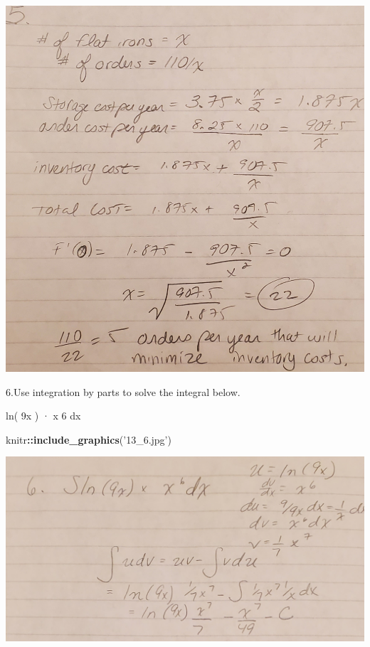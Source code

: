 \documentclass[
]{article}
\newenvironment{Shaded}{\begin{snugshade}}{\end{snugshade}}
\newcommand{\KeywordTok}[1]{\textcolor[rgb]{0.13,0.29,0.53}{\textbf{#1}}}
\newcommand{\NormalTok}[1]{#1}
\newcommand{\OperatorTok}[1]{\textcolor[rgb]{0.81,0.36,0.00}{\textbf{#1}}}
\newcommand{\StringTok}[1]{\textcolor[rgb]{0.31,0.60,0.02}{#1}}
\begin{document}
\includegraphics[width=23.18in]{13_5}

6.Use integration by parts to solve the integral below.

ln( 9x ) · x 6 dx

\begin{Shaded}
\begin{Highlighting}[]
\NormalTok{knitr}\OperatorTok{::}\KeywordTok{include_graphics}\NormalTok{(}\StringTok{'13_6.jpg'}\NormalTok{)}
\end{Highlighting}
\end{Shaded}

\includegraphics[width=26.78in]{13_6}
\end{document}
